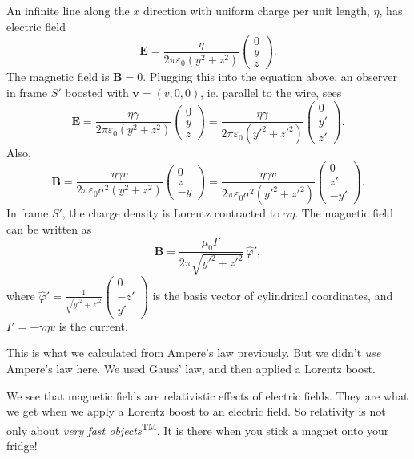 \documentclass[a4paper]{article}
\begin{document}
\begin{eg}
  An infinite line along the $x$ direction with uniform charge per unit length, $\eta$, has electric field
  \[
    \mathbf{E} = \frac{\eta}{2\pi \varepsilon_0 (y^2 + z^2)}
    \begin{pmatrix}
      0\\ y\\ z
    \end{pmatrix}.
  \]
  The magnetic field is $\mathbf{B} = 0$. Plugging this into the equation above, an observer in frame $S'$ boosted with $\mathbf{v} = (v, 0, 0)$, ie. parallel to the wire, sees
  \[
    \mathbf{E} = \frac{\eta\gamma}{2\pi\varepsilon_0(y^2 + z^2)}
    \begin{pmatrix}
      0\\y\\z
    \end{pmatrix} =
    \frac{\eta\gamma}{2\pi\varepsilon_0(y'^2 + z'^2)}
    \begin{pmatrix}
      0\\y'\\z'
    \end{pmatrix}.
  \]
  Also,
  \[
    \mathbf{B} = \frac{\eta\gamma v}{2\pi\varepsilon_0 \sigma^2(y^2 + z^2)}
    \begin{pmatrix}
      0\\z\\-y
    \end{pmatrix} = \frac{\eta\gamma v}{2\pi\varepsilon_0 \sigma^2(y'^2 + z'^2)}
    \begin{pmatrix}
      0\\z'\\-y'
    \end{pmatrix}.
  \]
  In frame $S'$, the charge density is Lorentz contracted to $\gamma\eta$. The magnetic field can be written as
  \[
    \mathbf{B} = \frac{\mu_0 I'}{2\pi \sqrt{y'^2 + z'^2}}\, \hat{\varphi}',
  \]
  where $\displaystyle \hat{\varphi}' = \frac{1}{\sqrt{y'^2 + z'^2}} \begin{pmatrix}0\\-z'\\y'\end{pmatrix}$ is the basis vector of cylindrical coordinates, and $I' = -\gamma\eta v$ is the current.

  This is what we calculated from Ampere's law previously. But we didn't \emph{use} Ampere's law here. We used Gauss' law, and then applied a Lorentz boost.
\end{eg}
We see that magnetic fields are relativistic effects of electric fields. They are what we get when we apply a Lorentz boost to an electric field. So relativity is not only about \emph{very fast objects}\textsuperscript{TM}. It is there when you stick a magnet onto your fridge!
\end{document}
